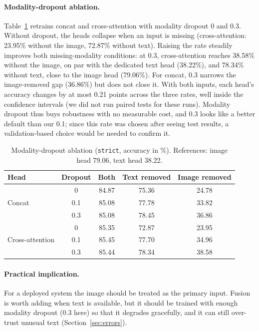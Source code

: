 \documentclass[11pt,a4paper]{article}
\begin{document}
\paragraph{Modality-dropout ablation.}
Table~\ref{tab:md} retrains concat and cross-attention with modality dropout 0 and 0.3. Without dropout, the heads
collapse when an input is missing (cross-attention: 23.95\% without the image, 72.87\% without text). Raising the
rate steadily improves both missing-modality conditions: at 0.3, cross-attention reaches 38.58\% without the image,
on par with the dedicated text head (38.22\%), and 78.34\% without text, close to the image head (79.06\%). For concat, 0.3 narrows the image-removed gap
(36.86\%) but does not close it. With both inputs, each head's accuracy changes by at most 0.21 points across the
three rates, well inside the confidence intervals (we did not run paired tests for these runs). Modality dropout
thus buys robustness with no measurable cost, and 0.3 looks like a better default than our 0.1; since this rate
was chosen after seeing test results, a validation-based choice would be needed to confirm it.

\begin{table}[!htbp]
\centering
\caption{Modality-dropout ablation (\texttt{strict}, accuracy in \%). References: image head 79.06, text head 38.22.}
\label{tab:md}
\small
\begin{tabular}{lcccc}
\toprule
Head & Dropout & Both & Text removed & Image removed \\
\midrule
\multirow{3}{*}{Concat} & 0 & 84.87 & 75.36 & 24.78 \\
 & 0.1 & 85.08 & 77.78 & 33.82 \\
 & 0.3 & 85.08 & 78.45 & 36.86 \\
\midrule
\multirow{3}{*}{Cross-attention} & 0 & 85.35 & 72.87 & 23.95 \\
 & 0.1 & 85.45 & 77.70 & 34.96 \\
 & 0.3 & 85.44 & 78.34 & 38.58 \\
\bottomrule
\end{tabular}
\end{table}

\paragraph{Practical implication.}
For a deployed system the image should be treated as the primary input. Fusion is worth adding when text is
available, but it should be trained with enough modality dropout (0.3 here) so that it degrades gracefully, and it
can still over-trust unusual text (Section~\ref{sec:errors}).
\end{document}

